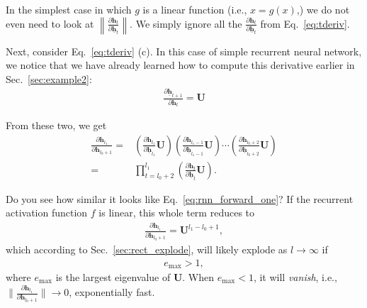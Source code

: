 \documentclass{report}
\newcommand{\vect}[1]{\mathbf{#1}}
\newcommand{\matr}[1]{\mathbf{#1}}
\newcommand{\vh}[0]{\vect{h}}
\newcommand{\mU}[0]{\matr{U}}
\begin{document}
In the simplest case in which $g$ is a linear function (i.e., $x=g(x)$,) we do
not even need to look at $\left\| \frac{\partial \vh_{t}}{\partial
\underline{\vh}_{t}} \right\|$. We simply ignore all the $\frac{\partial
\vh_t}{\partial \underline{\vh}_t}$ from Eq.~\eqref{eq:tderiv}.

Next, consider Eq.~\eqref{eq:tderiv} (c). In this case of simple recurrent
neural network, we notice that we have already learned how to compute this
derivative earlier in Sec.~\ref{sec:example2}:
\begin{align*}
    \frac{\partial \underline{\vh}_{t+1}}{\partial \vh_{t}} = \mU
\end{align*}

From these two, we get
\begin{align*}
    \frac{\partial \vh_{l_1}}{\partial \vh_{l_0+1}} =&
    \left(
    \frac{\partial \vh_{l_1}}{\partial \underline{\vh}_{l_1}}
    \mU
\right)
\left(
    \frac{\partial \vh_{l_1-1}}{\partial \underline{\vh}_{l_1-1}}
    \mU
\right)
    \cdots
\left(
    \frac{\partial \vh_{l_0+2}}{\partial \underline{\vh}_{l_0+2}}
    \mU
    \right) 
    \\
    =& \prod_{t=l_0+2}^{l_1} \left( \frac{\partial \vh_{t}}{\partial
\underline{\vh}_{t}} \mU\right).
\end{align*}

Do you see how similar it looks like Eq.~\eqref{eq:rnn_forward_one}? If the recurrent
activation function $f$ is linear, this whole term reduces to
\begin{align*}
    \frac{\partial \vh_{l_1}}{\partial \vh_{l_0+1}} = \mU^{l_1-l_0+1},
\end{align*}
which according to Sec.~\ref{sec:rect_explode}, will likely explode as
$l\to\infty$ if
\begin{align*}
    e_{\max} > 1,
\end{align*}
where $e_{\max}$ is the largest eigenvalue of $\mU$. When $e_{\max} < 1$, it
will {\em vanish}, i.e., $\|\frac{\partial \vh_{l_1}}{\partial \vh_{l_0+1}}\|
\to 0$, exponentially fast.
\end{document}
